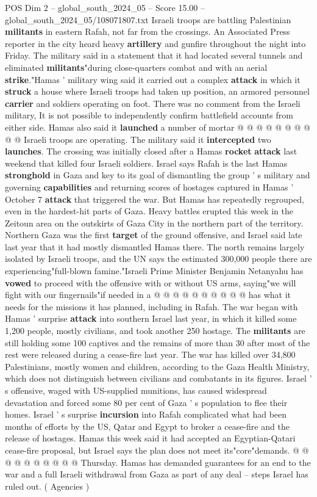 \begin{textsample}{POS Dim 2 – global\_south\_2024\_05 – Score 15.00 – global\_south\_2024\_05/108071807.txt}
Israeli troops are battling Palestinian \textbf{militants} in eastern Rafah, not far from the crossings.
An Associated Press reporter in the city heard heavy \textbf{artillery} and gunfire throughout the night into Friday.
The military said in a statement that it had located several tunnels and eliminated \textbf{militants}"during close-quarters combat and with an aerial \textbf{strike}."Hamas ' military wing said it carried out a complex \textbf{attack} in which it \textbf{struck} a house where Israeli troops had taken up position, an armored personnel \textbf{carrier} and soldiers operating on foot.
There was no comment from the Israeli military, It is not possible to independently confirm battlefield accounts from either side.
Hamas also said it \textbf{launched} a number of mortar @ @ @ @ @ @ @ @ @ @ Israeli troops are operating.
The military said it \textbf{intercepted} two \textbf{launches}.
The crossing was initially closed after a Hamas \textbf{rocket} \textbf{attack} last weekend that killed four Israeli soldiers.
Israel says Rafah is the last Hamas \textbf{stronghold} in Gaza and key to its goal of dismantling the group ' s military and governing \textbf{capabilities} and returning scores of hostages captured in Hamas ' October 7 \textbf{attack} that triggered the war.
But Hamas has repeatedly regrouped, even in the hardest-hit parts of Gaza.
Heavy battles erupted this week in the Zeitoun area on the outskirts of Gaza City in the northern part of the territory.
Northern Gaza was the first \textbf{target} of the ground offensive, and Israel said late last year that it had mostly dismantled Hamas there.
The north remains largely isolated by Israeli troops, and the UN says the estimated 300,000 people there are experiencing"full-blown famine."Israeli Prime Minister Benjamin Netanyahu has \textbf{vowed} to proceed with the offensive with or without US arms, saying"we will fight with our fingernails"if needed in a @ @ @ @ @ @ @ @ @ @ has what it needs for the missions it has planned, including in Rafah.
The war began with Hamas ' surprise \textbf{attack} into southern Israel last year, in which it killed some 1,200 people, mostly civilians, and took another 250 hostage.
The \textbf{militants} are still holding some 100 captives and the remains of more than 30 after most of the rest were released during a cease-fire last year.
The war has killed over 34,800 Palestinians, mostly women and children, according to the Gaza Health Ministry, which does not distinguish between civilians and combatants in its figures.
Israel ' s offensive, waged with US-supplied munitions, has caused widespread devastation and forced some 80 per cent of Gaza ' s population to flee their homes.
Israel ' s surprise \textbf{incursion} into Rafah complicated what had been months of efforts by the US, Qatar and Egypt to broker a cease-fire and the release of hostages.
Hamas this week said it had accepted an Egyptian-Qatari cease-fire proposal, but Israel says the plan does not meet its"core"demands. @ @ @ @ @ @ @ @ @ @ Thursday.
Hamas has demanded guarantees for an end to the war and a full Israeli withdrawal from Gaza as part of any deal -- steps Israel has ruled out. ( Agencies )


\end{textsample}
